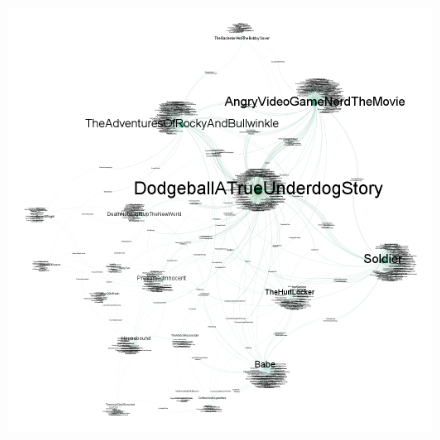 \documentclass[letterpaper]{article}
\begin{document}
\begin{figure}
	\centering
	\includegraphics[width=0.9\linewidth]{../data/gephi/pairs_films-trope_1k_v3}
	\caption{}
	\label{fig:pairsfilms-trope1kv3}
\end{figure}










   





\end{document}

